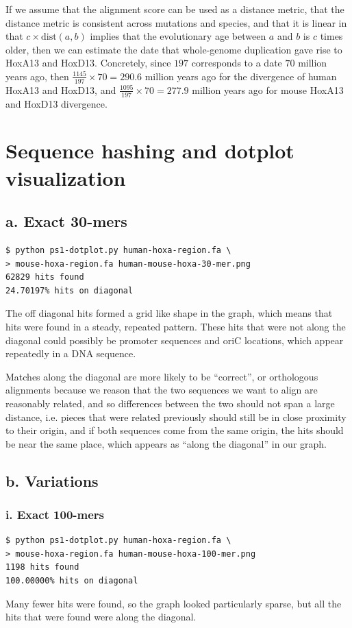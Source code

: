 \documentclass[a4paper]{article}
\begin{document}
If we assume that the alignment score can be used as a distance metric,
that the distance metric is consistent across mutations and species,
and that it is linear in that $c \times \text{dist}(a, b)$ implies that
the evolutionary age between $a$ and $b$ is $c$ times older, then
we can estimate the date that whole-genome duplication gave rise to HoxA13
and HoxD13. Concretely, since $197$ corresponds to a date $70$ million
years ago, then $\frac{1145}{197} \times 70 = 290.6$ million years ago
for the divergence of human HoxA13 and HoxD13, and
$\frac{1095}{197} \times 70 = 277.9$ million years ago for
mouse HoxA13 and HoxD13 divergence.

\section{Sequence hashing and dotplot visualization}

\subsection*{a. Exact 30-mers}

\begin{verbatim}
$ python ps1-dotplot.py human-hoxa-region.fa \
> mouse-hoxa-region.fa human-mouse-hoxa-30-mer.png
62829 hits found
24.70197% hits on diagonal
\end{verbatim}

The off diagonal hits formed a grid like shape in the
graph, which means that hits were found in a steady,
repeated pattern. These hits that were not along the 
diagonal could possibly be promoter sequences and oriC
locations, which appear repeatedly in a DNA sequence.

Matches along the diagonal are more likely to be ``correct'',
or orthologous alignments because we reason that the two
sequences we want to align are reasonably related, and so
differences between the two should not span a large distance,
i.e. pieces that were related previously should still be
in close proximity to their origin, and if both sequences
come from the same origin, the hits should be near the same place,
which appears as ``along the diagonal'' in our graph.

\subsection*{b. Variations}
\subsubsection*{i. Exact 100-mers}
\begin{verbatim}
$ python ps1-dotplot.py human-hoxa-region.fa \
> mouse-hoxa-region.fa human-mouse-hoxa-100-mer.png
1198 hits found
100.00000% hits on diagonal
\end{verbatim}
Many fewer hits were found, so the graph looked
particularly sparse, but all the hits that were found
were along the diagonal.
\end{document}

